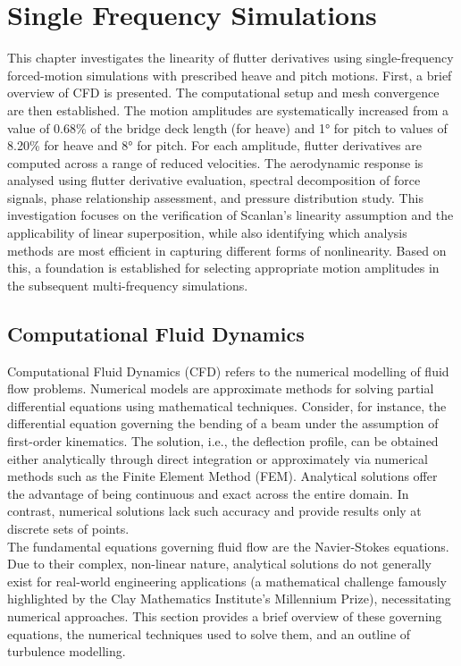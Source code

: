 \documentclass[../main]{subfiles}
\begin{document}
\chapter{Single Frequency Simulations}
\label{cha:single_frequency}

This chapter investigates the linearity of flutter derivatives using single-frequency forced-motion simulations with 
prescribed heave and pitch motions. First, a brief overview of CFD is presented. 
The computational setup and mesh convergence are then established. 
The motion amplitudes are systematically increased from a value of 0.68\% of the bridge deck length (for heave) and 1° for pitch to values of 
8.20\% for heave and 8° for pitch. For each amplitude, flutter derivatives 
are computed across a range of reduced velocities. The aerodynamic response is analysed using flutter derivative evaluation, spectral decomposition of force signals, 
phase relationship assessment, and pressure distribution study. This investigation focuses on the verification of Scanlan's 
linearity assumption and the applicability of linear superposition, while also identifying which analysis methods 
are most efficient in capturing different forms of nonlinearity. Based on this, a foundation is established for selecting 
appropriate motion amplitudes in the subsequent multi-frequency simulations.

\section{Computational Fluid Dynamics}

Computational Fluid Dynamics (CFD) refers to the numerical modelling of fluid flow problems. Numerical models are 
approximate methods for solving partial differential equations using mathematical techniques. Consider, 
for instance, the differential equation governing the bending of a beam under the assumption of first-order kinematics. 
The solution, i.e., the deflection profile, can be obtained either analytically through direct integration or approximately 
via numerical methods such as the Finite Element Method (FEM). Analytical solutions offer the advantage of being continuous 
and exact across the entire domain. In contrast, 
numerical solutions lack such accuracy and provide results only at discrete sets of points. \\

The fundamental equations governing fluid flow are the Navier-Stokes equations. Due to their complex, non-linear nature, 
analytical solutions do not generally exist for real-world engineering applications (a mathematical challenge famously 
highlighted by the Clay Mathematics Institute's Millennium Prize), necessitating numerical approaches. This section provides a 
brief overview of these governing equations, the numerical techniques used to solve them, and an outline of turbulence 
modelling.
\end{document}
